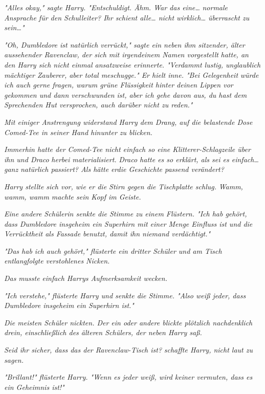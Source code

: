 {\emph{"Alles okay," sagte Harry. "Entschuldigt. Ähm. War das eine…} \emph{\emph{normale}} \emph{Ansprache für den Schulleiter? Ihr schient alle… nicht wirklich… überrascht zu sein…"}

\emph{"Oh, Dumbledore ist natürlich verrückt," sagte ein neben ihm sitzender, älter aussehender Ravenclaw, der sich mit irgendeinem Namen vorgestellt} \emph{hatte, an den Harry sich nicht einmal ansatzweise erinnerte. "Verdammt lustig, unglaublich mächtiger Zauberer, aber total meschugge." Er hielt inne. "Bei Gelegenheit} \emph{würde ich auch gerne fragen, warum grüne Flüssigkeit hinter deinen Lippen vor gekommen und dann verschwunden ist, aber ich gehe davon aus, du hast dem Sprechenden Hut versprochen, auch darüber nicht zu reden."}

\emph{Mit einiger Anstrengung widerstand Harry dem Drang, auf die belastende Dose Comed-Tee in seiner Hand hinunter zu blicken.}

\emph{Immerhin hatte der Comed-Tee nicht einfach so eine Klitterer-Schlagzeile über ihn und Draco} \emph{\emph{herbei materialisiert.}} \emph{Draco hatte es so erklärt, als sei es einfach…} \emph{ganz} \emph{natürlich passiert? Als hätte} \emph{er\emph{die Geschichte passend verändert?}}

\emph{Harry stellte sich vor, wie er die Stirn gegen die Tischplatte schlug.} \emph{\emph{Wamm, wamm, wamm}} \emph{machte sein Kopf im Geiste.}

\emph{Eine andere Schülerin senkte die Stimme zu einem Flüstern. "Ich hab gehört, dass Dumbledore insgeheim ein Superhirn mit einer Menge Einfluss ist und die Verrücktheit als Fassade benutzt, damit ihn niemand verdächtigt."}

\emph{"Das hab ich auch gehört," flüsterte ein dritter Schüler und am Tisch} \emph{entlangfolgte verstohlenes Nicken.}

\emph{Das} \emph{musste} \emph{einfach} \emph{Harrys Aufmerksamkeit wecken.}

\emph{"Ich verstehe," flüsterte Harry und senkte die Stimme. "Also weiß jeder, dass Dumbledore insgeheim ein Superhirn ist."}

\emph{Die meisten Schüler nickten. Der ein oder andere blickte plötzlich nachdenklich drein, einschließlich des älteren Schülers, der neben Harry saß.}

\emph{\emph{Seid ihr sicher, dass das der Ravenclaw-Tisch ist?}} \emph{schaffte Harry, nicht laut zu sagen.}

\emph{"Brillant!" flüsterte Harry. "Wenn es jeder weiß, wird keiner vermuten, dass es ein Geheimnis ist!"}

}
